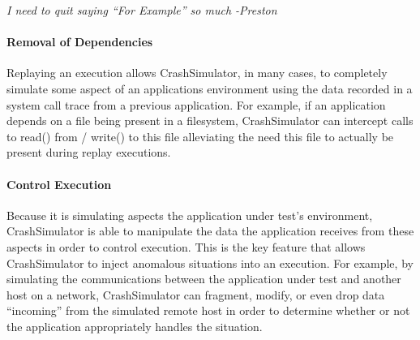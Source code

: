     \emph{I need to quit saying ``For Example'' so much -Preston}

    \paragraph{Removal of Dependencies}

    Replaying an execution allows CrashSimulator, in many cases, to completely simulate some aspect of an applications
    environment using the data recorded in a system call trace from a previous application.  For example, if an
    application depends on a file being present in a filesystem, CrashSimulator can intercept calls to read()
    from / write() to this file alleviating the need this file to actually be present during replay executions.

    \paragraph{Control Execution}

    Because it is simulating aspects the application under test's environment, CrashSimulator is able to manipulate the
    data the application receives from these aspects in order to control execution.  This is the key feature that allows
    CrashSimulator to inject anomalous situations into an execution.  For example, by simulating the communications
    between the application under test and another host on a network, CrashSimulator can fragment, modify, or even drop
    data ``incoming'' from the simulated remote host in order to determine whether or not the application appropriately
    handles the situation. 